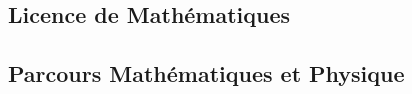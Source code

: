 \documentclass[10pt, a5paper]{report}
\begin{document}
\begin{spacing}{1.5}

\chapter*{Licence de Mathématiques}

\vfill
\section*{Parcours Mathématiques et Physique}
\vfill


\end{spacing}
\end{document}
